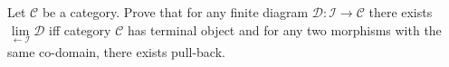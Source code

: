 Let $\mathcal C$ be a category. Prove that for any finite diagram $\mathcal D: \mathcal I \to \mathcal C$ there exists $\underset{\leftarrow \mathcal I}{\lim } \mathcal D$ iff category $\mathcal C$ has terminal object and for any two morphisms with the same co-domain, there exists pull-back.